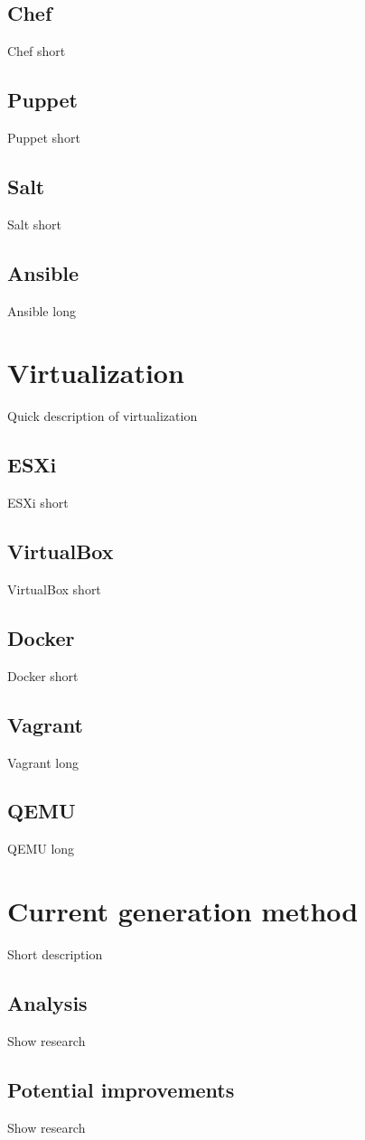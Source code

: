 \documentclass[12pt,a4paper]{report}
\begin{document}
\subsection{Chef}
Chef short
\subsection{Puppet}
Puppet short
\subsection{Salt}
Salt short
\subsection{Ansible}
Ansible long
\section{Virtualization}
Quick description of virtualization
\subsection{ESXi}
ESXi short
\subsection{VirtualBox}
VirtualBox short
\subsection{Docker}
Docker short
\subsection{Vagrant}
Vagrant long
\subsection{QEMU}
QEMU long
\section{Current generation method}
Short description
\subsection{Analysis}
Show research
\subsection{Potential improvements}
Show research
\end{document}
